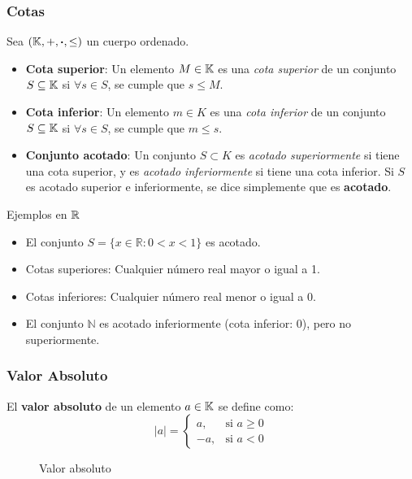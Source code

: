 \subsubsection{Cotas}

Sea $(\mathbb{K}, +, \boldsymbol{\cdot}, \leq)$ un cuerpo ordenado.

\begin{itemize}
	\item \textbf{Cota superior}: Un elemento $M \in \mathbb{K}$ es una \textit{cota superior} de un conjunto $S \subseteq \mathbb{K}$ si $\forall s \in S$, se cumple que $s \leq M$.
	\item \textbf{Cota inferior}: Un elemento $m \in K$ es una \textit{cota inferior} de un conjunto $S \subseteq \mathbb{K}$ si $\forall s \in S$, se cumple que $m \leq s$.
	\item \textbf{Conjunto acotado}: Un conjunto $S \subset K$ es \textit{acotado superiormente} si tiene una cota superior, y es \textit{acotado inferiormente} si tiene una cota inferior. Si $S$ es acotado superior e inferiormente, se dice simplemente que es \textbf{acotado}.
\end{itemize}

\begin{fmd-example}[Cotas]
	Ejemplos en $\mathbb{R}$
	\begin{itemize}
		\item El conjunto $S = \{x \in \mathbb{R} : 0 < x < 1\}$ es acotado.
		\item Cotas superiores: Cualquier número real mayor o igual a 1.
		\item Cotas inferiores: Cualquier número real menor o igual a 0.
		\item El conjunto $\mathbb{N}$ es acotado inferiormente (cota inferior: 0), pero no superiormente.
	\end{itemize}
\end{fmd-example}

\subsubsection{Valor Absoluto}

El \textbf{valor absoluto} de un elemento $a \in \mathbb{K}$ se define como:
\[ |a| =
\begin{cases}
	a, & \text{si } a \geq 0 \\
	-a, & \text{si } a < 0
\end{cases} \]

\begin{figure}[H]
	\centering
	\caption{Valor absoluto}
\end{figure}

